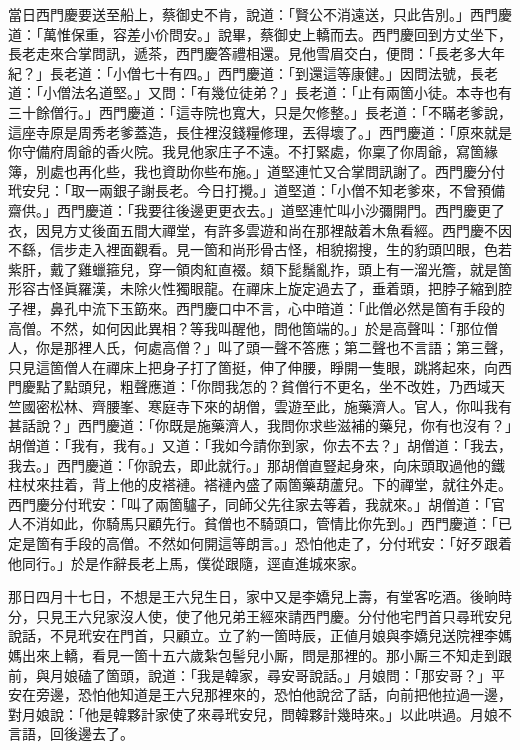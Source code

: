 當日西門慶要送至船上，蔡御史不肯，說道：「賢公不消遠送，只此告別。」西門慶道：「萬惟保重，容差小价問安。」說畢，蔡御史上轎而去。西門慶回到方丈坐下，長老走來合掌問訊，遞茶，西門慶答禮相還。見他雪眉交白，便問：「長老多大年紀？」長老道：「小僧七十有四。」西門慶道：「到還這等康健。」因問法號，長老道：「小僧法名道堅。」又問：「有幾位徒弟？」長老道：「止有兩箇小徒。本寺也有三十餘僧行。」西門慶道：「這寺院也寬大，只是欠修整。」長老道：「不瞞老爹說，這座寺原是周秀老爹蓋造，長住裡沒錢糧修理，丟得壞了。」西門慶道：「原來就是你守備府周爺的香火院。我見他家庄子不遠。不打緊處，你稟了你周爺，寫箇緣簿，別處也再化些，我也資助你些布施。」道堅連忙又合掌問訊謝了。西門慶分付玳安兒：「取一兩銀子謝長老。今日打攪。」道堅道：「小僧不知老爹來，不曾預備齋供。」西門慶道：「我要往後邊更更衣去。」道堅連忙叫小沙彌開門。西門慶更了衣，因見方丈後面五間大禪堂，有許多雲遊和尚在那裡敲着木魚看經。西門慶不因不繇，信步走入裡面觀看。見一箇和尚形骨古怪，相貌搊搜，生的豹頭凹眼，色若紫肝，戴了雞蠟箍兒，穿一領肉紅直裰。頦下髭鬚亂拃，頭上有一溜光簷，就是箇形容古怪眞羅漢，未除火性獨眼龍。{}在禪床上旋定過去了，垂着頭，把脖子縮到腔子裡，鼻孔中流下玉筯來。西門慶口中不言，心中暗道：「此僧必然是箇有手段的高僧。不然，如何因此異相？等我叫醒他，問他箇端的。」於是高聲叫：「那位僧人，你是那裡人氏，何處高僧？」叫了頭一聲不答應；第二聲也不言語；第三聲，只見這箇僧人在禪床上把身子打了箇挺，伸了伸腰，睜開一隻眼，跳將起來，向西門慶點了點頭兒，{}粗聲應道：「你問我怎的？貧僧行不更名，坐不改姓，乃西域天竺國密松林、齊腰峯、寒庭寺下來的胡僧，雲遊至此，施藥濟人。官人，你叫我有甚話說？」西門慶道：「你既是施藥濟人，我問你求些滋補的藥兒，你有也沒有？」胡僧道：「我有，我有。」又道：「我如今請你到家，你去不去？」胡僧道：「我去，我去。」西門慶道：「你說去，即此就行。」那胡僧直豎起身來，向床頭取過他的鐵柱杖來拄着，背上他的皮褡褳。褡褳內盛了兩箇藥葫蘆兒。下的禪堂，就往外走。西門慶分付玳安：「叫了兩箇驢子，同師父先往家去等着，我就來。」胡僧道：「官人不消如此，你騎馬只顧先行。貧僧也不騎頭口，管情比你先到。」西門慶道：「已定是箇有手段的高僧。不然如何開這等朗言。」恐怕他走了，分付玳安：「好歹跟着他同行。」於是作辭長老上馬，僕從跟隨，逕直進城來家。

那日四月十七日，不想是王六兒生日，家中又是李嬌兒上壽，有堂客吃酒。後晌時分，只見王六兒家沒人使，使了他兄弟王經來請西門慶。分付他宅門首只尋玳安兒說話，不見玳安在門首，只顧立。立了約一箇時辰，正値月娘與李嬌兒送院裡李媽媽出來上轎，看見一箇十五六歲紮包髻兒小厮，問是那裡的。那小厮三不知走到跟前，與月娘磕了箇頭，說道：「我是韓家，尋安哥說話。」月娘問：「那安哥？」平安在旁邊，恐怕他知道是王六兒那裡來的，恐怕他說岔了話，向前把他拉過一邊，對月娘說：「他是韓夥計家使了來尋玳安兒，問韓夥計幾時來。」以此哄過。月娘不言語，回後邊去了。

